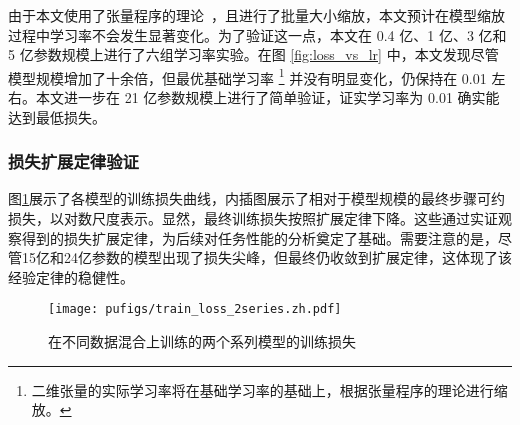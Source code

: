 由于本文使用了张量程序的理论~\citep{yang2022tensor, yang2023tensor}，且进行了批量大小缩放，本文预计在模型缩放过程中学习率不会发生显著变化。为了验证这一点，本文在 0.4 亿、1 亿、3 亿和 5 亿参数规模上进行了六组学习率实验。在图 \ref {fig:loss_vs_lr} 中，本文发现尽管模型规模增加了十余倍，但最优基础学习率 \footnote{二维张量的实际学习率将在基础学习率的基础上，根据张量程序的理论进行缩放。} 并没有明显变化，仍保持在 0.01 左右。本文进一步在 21 亿参数规模上进行了简单验证，证实学习率为 0.01 确实能达到最低损失。

\subsubsection{损失扩展定律验证}
图\ref{fig:loss_scaling}展示了各模型的训练损失曲线，内插图展示了相对于模型规模的最终步骤可约损失，以对数尺度表示。显然，最终训练损失按照扩展定律下降。这些通过实证观察得到的损失扩展定律，为后续对任务性能的分析奠定了基础。需要注意的是，尽管15亿和24亿参数的模型出现了损失尖峰，但最终仍收敛到扩展定律，这体现了该经验定律的稳健性。


\begin{figure}[!htbp]
        \centering
        \texttt{[image: pufigs/train\_loss\_2series.zh.pdf]}
        \label{fig:train_loss_2series}
\caption{在不同数据混合上训练的两个系列模型的训练损失}
    \label{fig:loss_scaling}
\end{figure}


